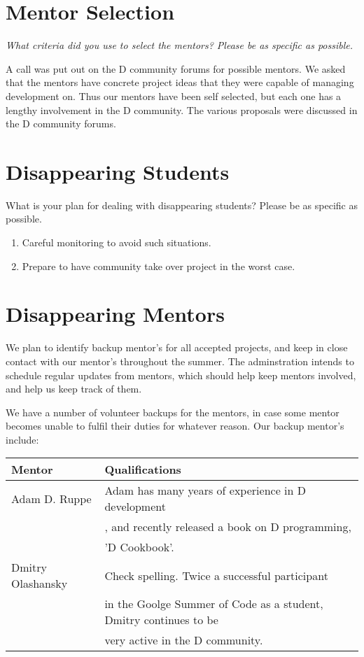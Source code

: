 \documentclass[a4paper,12pt]{article}
\begin{document}
\section{Mentor Selection}

\emph{What criteria did you use to select the mentors? 
Please be as specific as possible.}

A call was put out on the D community forums for possible mentors.
We asked that the mentors have concrete project ideas that
they were capable of managing development on.  Thus our mentors
have been self selected, but each one has a lengthy involvement 
in the D community. The various proposals were discussed
in the D community forums. 

\section{Disappearing Students}
What is your plan for dealing with disappearing students? 
Please be as specific as possible.

\begin{enumerate}
\item Careful monitoring to avoid such situations.
\item Prepare to have community take over project in the worst case.
\end{enumerate}

\section{Disappearing Mentors}

We plan to identify backup mentor's for all accepted projects, 
and keep in close contact with our mentor's throughout the
summer.  The adminstration intends to schedule regular updates
from mentors, which should help keep mentors involved, and help
us keep track of them.

We have a number of volunteer backups for the mentors, in case
some mentor becomes unable to fulfil their duties for whatever
reason.  Our backup mentor's include:

\begin{center}
   \begin{tabular}{ | l | l | }
     \hline
     \textbf{Mentor} & \textbf{Qualifications} \\ \hline
     Adam D. Ruppe & Adam has many years of experience in D development\\
     & , and recently released a book on D programming, \\
     & 'D Cookbook'.\\ \hline
     Dmitry Olashansky & Check spelling. Twice a successful participant \\
     & in the Goolge Summer of Code as a student, Dmitry continues to be \\
     & very active in the D community. \\
   \end{tabular}
\end{center}
\end{document}
